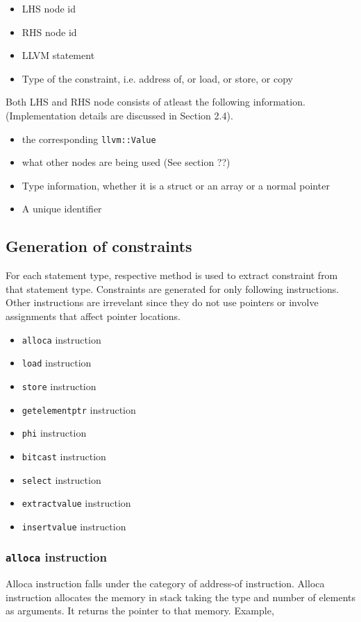 \documentclass[a4paper,12pt]{report}
\begin{document}
\begin{itemize}
    \item LHS node id
    \item RHS node id
    \item LLVM statement
    \item Type of the constraint, i.e. address of, or load, or store, or copy
\end{itemize}

\noindent
Both LHS and RHS node consists of atleast the following information. 
(Implementation details are discussed in Section 2.4).

\begin{itemize}
    \item the corresponding \texttt{llvm::Value}
    \item what other nodes are being used (See section ??)
    \item Type information, whether it is a struct or an array or a normal 
pointer
    \item A unique identifier
\end{itemize}

\subsection{Generation of constraints}
For each statement type, respective method is used to extract constraint from
that statement type. Constraints are generated for only following instructions.
Other instructions are irrevelant since they do not use pointers or involve
assignments that affect pointer locations.

\begin{itemize}
    \item \texttt{alloca} instruction
    \item \texttt{load} instruction
    \item \texttt{store} instruction
    \item \texttt{getelementptr} instruction
    \item \texttt{phi} instruction
    \item \texttt{bitcast} instruction
    \item \texttt{select} instruction
    \item \texttt{extractvalue} instruction
    \item \texttt{insertvalue} instruction
\end{itemize}

\subsubsection{\texttt{alloca} instruction}
Alloca instruction falls under the category of address-of instruction. Alloca 
instruction allocates the memory in stack taking the type and number of 
elements as arguments. It returns the pointer to that memory. 
Example,
\end{document}
